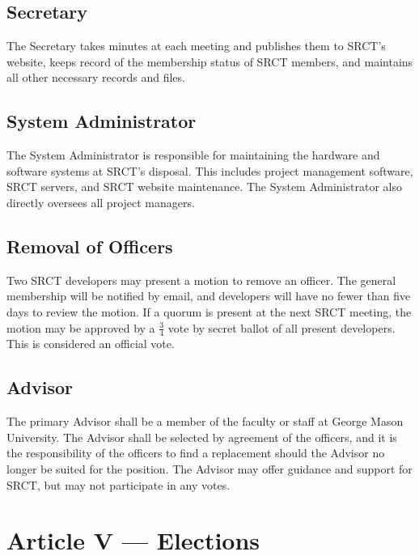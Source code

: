 \documentclass{article}
\begin{document}
  \subsection{Secretary}
  The Secretary takes minutes at each meeting and publishes them to 
  SRCT's website, keeps record of the membership status of SRCT members, 
  and maintains all other necessary records and files.
  
  \subsection{System Administrator}
  The System Administrator is responsible for maintaining the hardware 
  and software systems at SRCT's disposal. This includes project 
  management software, SRCT servers, and SRCT website maintenance. The
  System Administrator also directly oversees all project managers.

  \subsection{Removal of Officers}
  Two SRCT developers may present a motion to remove an officer. The general
  membership will be notified by email, and developers will have no fewer
  than five days to review the motion. If a quorum is present at the next
  SRCT meeting, the motion may be approved by a $\frac{3}{4}$ vote by secret 
  ballot of all present developers. This is considered an official vote.
  
  \subsection{Advisor}
  The primary Advisor shall be a member of the faculty or staff at 
  George Mason University. The Advisor shall be selected by agreement of 
  the officers, and it is the responsibility of the officers to find a
  replacement should the Advisor no longer be suited for the position.
  The Advisor may offer guidance and support for SRCT, but may not 
  participate in any votes.
  
  \section{Article V --- Elections}
\end{document}
